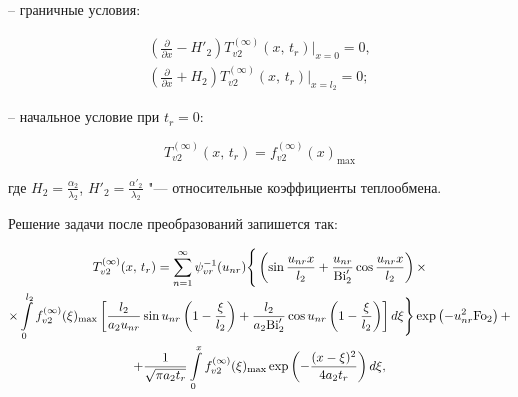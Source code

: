 -- граничные условия:

\begin{gather}

\label{evdok:eq37}

\left( {\frac{\partial }{\partial x} - H'_2 } \right)T_{v2}^{(\infty )} (x,\,t_r )\Big|_{x = 0} = 0,\\

\label{evdok:eq38}

\left( {\frac{\partial }{\partial x} + H_2 } \right)T_{v2}^{(\infty )} (x,\,t_r )\Big|_{x = l_2} = 0;

\end{gather}



-- начальное условие при $t_r=0$:

\begin{equation}

\label{evdok:eq39}

T_{v2}^{(\infty )} (x,\,t_r ) = f_{v2}^{(\infty )} (x)_{\max } 

\end{equation}

где $H_2 = \frac{\alpha _2 }{\lambda _2 }$, $H'_2 = \frac{\alpha' _2}{\lambda _2 }$ "--- относительные коэффициенты теплообмена.



Решение задачи после преобразований запишется так:

\begin{multline}

T_{v2}^{(\infty )} (x,\,t_r ) = 

\sum\limits_{n = 1}^\infty 

\psi _{vr}^{ - 1} (u_{nr} )

\Bigg\{ 

\left( \sin \frac{u_{nr} x}{l_2 } + \frac{u_{nr} }{{\rm Bi}'_2 }

\cos \frac{u_{nr} x}{l_2} \right)\times 

\\

\times 

\int\limits_0^{l_2 } 

f_{v2}^{(\infty )} (\xi )_{\max }  

\left[ \frac{l_2 }{a_2 u_{nr} }\sin u_{nr} 

\left( 1 - \frac{\xi }{l_2 }\right) + 

\frac{l_2 }{a_2 {\rm Bi}'_2}\cos u_{nr} 

\left( 1 - \frac{\xi }{l_2 }\right) 

\right]d\xi  \Bigg\} \exp \left(  - u_{nr}^2 {\rm Fo}_2  \right) + 

\\

\label{evdok:eq40}

 + \frac{1}{\sqrt {\pi a_2 t_r } }\int\limits_0^x 

f_{v2}^{(\infty )} (\xi )_{\max }  \exp \left(  - \frac{(x - \xi )^2}{4a_2 t_r} \right)d\xi,

\end{multline}



